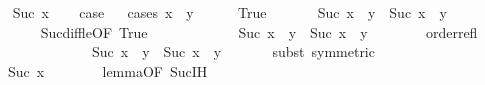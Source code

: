 \begin{isabellebody}
\isanewline
\ \ \isamarkupfalse%
\ {\isacharparenleft}{\kern0pt}Suc\ x{\isacharparenright}{\kern0pt}\isanewline
\ \ \isamarkupfalse%
\ {\isacharquery}{\kern0pt}case\isanewline
\ \ \isamarkupfalse%
{\isacharparenleft}{\kern0pt}cases\ {\isachardoublequoteopen}x\ {\isasymge}\ y{\isachardoublequoteclose}{\isacharparenright}{\kern0pt}\isanewline
\ \ \ \ \isamarkupfalse%
\ True\isanewline
\ \ \ \ \isamarkupfalse%
\ {}{\isacharcolon}{\kern0pt}\ {\isachardoublequoteopen}{\isacharparenleft}{\kern0pt}Suc\ x{\isacharparenright}{\kern0pt}\ {\isacharminus}{\kern0pt}\ y\ {\isacharequal}{\kern0pt}\ Suc\ {\isacharparenleft}{\kern0pt}x\ {\isacharminus}{\kern0pt}\ y{\isacharparenright}{\kern0pt}{\isachardoublequoteclose}\isanewline
\ \ \ \ \ \ \isamarkupfalse%
\ Suc{\isacharunderscore}{\kern0pt}diff{\isacharunderscore}{\kern0pt}le{\isacharbrackleft}{\kern0pt}OF\ True{\isacharbrackright}{\kern0pt}\isanewline
\ \ \ \ \ \ \isacommand{{\isachardot}{\kern0pt}}\isamarkupfalse%
\isanewline
\ \ \ \ \isamarkupfalse%
\ {\isachardoublequoteopen}Suc\ x\ {\isacharminus}{\kern0pt}\ y\ {\isasymle}\ Suc\ x\ {\isacharminus}{\kern0pt}\ y{\isachardoublequoteclose}\isanewline
\ \ \ \ \ \ \isamarkupfalse%
\ order{\isachardot}{\kern0pt}refl\isanewline
\ \ \ \ \ \ \isacommand{{\isachardot}{\kern0pt}}\isamarkupfalse%
\isanewline
\ \ \ \ \isamarkupfalse%
\ \isamarkupfalse%
\ {}{\isacharcolon}{\kern0pt}\ {\isachardoublequoteopen}Suc\ x\ {\isacharminus}{\kern0pt}\ y\ {\isasymle}\ Suc\ {\isacharparenleft}{\kern0pt}x\ {\isacharminus}{\kern0pt}\ y{\isacharparenright}{\kern0pt}{\isachardoublequoteclose}\isanewline
\ \ \ \ \ \ \isamarkupfalse%
{\isacharparenleft}{\kern0pt}subst\ {}{\isacharbrackleft}{\kern0pt}symmetric{\isacharbrackright}{\kern0pt}{\isacharparenright}{\kern0pt}\isanewline
\ \ \ \ \ \ \isacommand{{\isachardot}{\kern0pt}}\isamarkupfalse%
\isanewline
\ \ \ \ \isamarkupfalse%
\ \isamarkupfalse%
\ {\isachardoublequoteopen}{\isachardot}{\kern0pt}{\isachardot}{\kern0pt}{\isachardot}{\kern0pt}\ {\isasymle}\ Suc\ x{\isachardoublequoteclose}\isanewline
\ \ \ \ \ \ \isamarkupfalse%
\ lemma{}{\isacharbrackleft}{\kern0pt}OF\ Suc{\isachardot}{\kern0pt}IH{\isacharbrackright}{\kern0pt}\isanewline
\ \ \ \ \ \ \isacommand{{\isachardot}{\kern0pt}}\isamarkupfalse%
\isanewline
\ \ \ \ \isamarkupfalse%

\end{isabellebody}
